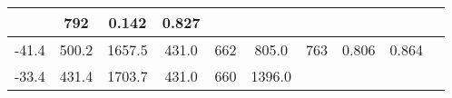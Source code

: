 \documentclass[a4paper,10pt]{article}
\begin{document}
\begin{longtable}{
     |
%    
    c|
%    
    c|
%    
    c|
%    
    c|
%    
    c|
%    
    c|
%    
    c|
%    
    c|
%    
    c|
%    
    c|
%    
    }
%        
        & 792
%        

%        

%        
        & 0.142
%        

%        

%        
        & 0.827
%        

%        
        \\
        \hline

        

%        

%        
        -41.4
%        

%        

%        
        & 500.2
%        

%        

%        
        & 1657.5
%        

%        

%        
        & 431.0
%        

%        

%        
        & 662
%        

%        

%        
        & 805.0
%        

%        

%        
        & 763
%        

%        

%        
        & 0.806
%        

%        

%        
        & 0.864
%        

%        
        \\
        \hline

        

%        

%        
        -33.4
%        

%        

%        
        & 431.4
%        

%        

%        
        & 1703.7
%        

%        

%        
        & 431.0
%        

%        

%        
        & 660
%        

%        

%        
        & 1396.0
%        

%        


\end{longtable}
\end{document}
